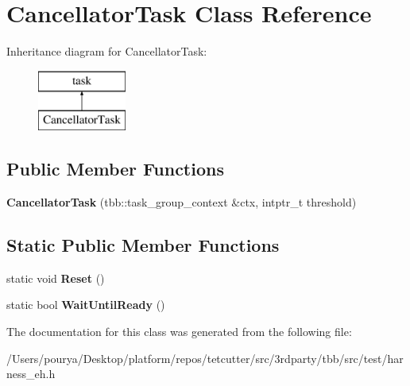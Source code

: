 \hypertarget{classCancellatorTask}{}\section{Cancellator\+Task Class Reference}
\label{classCancellatorTask}
Inheritance diagram for Cancellator\+Task\+:\begin{figure}[H]
\begin{center}
\leavevmode
\includegraphics[height=2.000000cm]{classCancellatorTask}
\end{center}
\end{figure}
\subsection*{Public Member Functions}
\begin{DoxyCompactItemize}
\item 
\hypertarget{classCancellatorTask_a19cb8723ae861386c32dbee92cf8d355}{}{\bfseries Cancellator\+Task} (tbb\+::task\+\_\+group\+\_\+context \&ctx, intptr\+\_\+t threshold)\label{classCancellatorTask_a19cb8723ae861386c32dbee92cf8d355}

\end{DoxyCompactItemize}
\subsection*{Static Public Member Functions}
\begin{DoxyCompactItemize}
\item 
\hypertarget{classCancellatorTask_afbbb7abef90e882b1c79541acbcb5294}{}static void {\bfseries Reset} ()\label{classCancellatorTask_afbbb7abef90e882b1c79541acbcb5294}

\item 
\hypertarget{classCancellatorTask_ab124ffed1349f34310870a3fdf77004e}{}static bool {\bfseries Wait\+Until\+Ready} ()\label{classCancellatorTask_ab124ffed1349f34310870a3fdf77004e}

\end{DoxyCompactItemize}


The documentation for this class was generated from the following file\+:\begin{DoxyCompactItemize}
\item 
/\+Users/pourya/\+Desktop/platform/repos/tetcutter/src/3rdparty/tbb/src/test/harness\+\_\+eh.\+h\end{DoxyCompactItemize}
